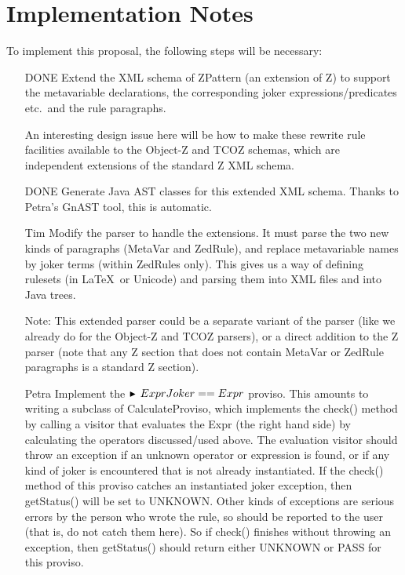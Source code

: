 \documentclass{article}
\newcommand{\proviso}{\raisebox{0.5ex}{${}_{\blacktriangleright}\ $}}%
\begin{document}
\section{Implementation Notes}

To implement this proposal, the following steps will be necessary:
\begin{enumerate}
\item [DONE] Extend the XML schema of ZPattern (an extension of Z)
  to support the metavariable declarations, the corresponding joker
  expressions/predicates etc.~and the rule paragraphs.

  An interesting design issue here
  will be how to make these rewrite rule facilities available
  to the Object-Z and TCOZ schemas, which are independent extensions
  of the standard Z XML schema.

\item [DONE] Generate Java AST classes for this extended XML schema.
  Thanks to Petra's GnAST tool, this is automatic.

\item [Tim] Modify the parser to handle the extensions.
  It must parse the two new kinds of paragraphs (MetaVar and ZedRule), and
  replace metavariable names by joker terms (within ZedRules only).
  This gives us a way of defining rulesets (in \LaTeX\ or Unicode)
  and parsing them into XML files and into Java trees.

  Note: This extended parser could be a separate variant of the
  parser (like we already do for the Object-Z and TCOZ parsers),
  or a direct addition to the Z parser (note that any Z section 
  that does not contain MetaVar or ZedRule paragraphs is a standard
  Z section).

\item [Petra] Implement the $\proviso ExprJoker == Expr$ proviso.
  This amounts to writing a subclass of CalculateProviso, which
  implements the check() method by calling a visitor that evaluates the 
  Expr (the right hand side) by calculating the operators discussed/used
  above.
  The evaluation visitor should throw an exception if an unknown operator or
  expression is found, or if any kind of joker is encountered
  that is not already instantiated.  If the check() method of this proviso
  catches an instantiated joker exception, then getStatus() will be set to
  UNKNOWN.  Other kinds of exceptions are serious errors by the person who
  wrote the rule, so should be reported to the user (that is, do not
  catch them here).  So if check() finishes without throwing an exception,
  then getStatus() should return either UNKNOWN or PASS for this proviso.
  


\end{enumerate}
\end{document}
